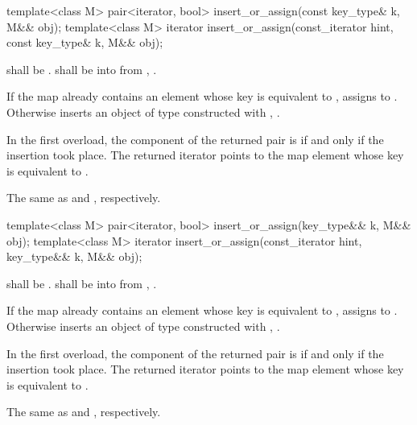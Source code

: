 %
\begin{itemdecl}
template<class M>
  pair<iterator, bool> insert_or_assign(const key_type& k, M&& obj);
template<class M>
  iterator insert_or_assign(const_iterator hint, const key_type& k, M&& obj);
\end{itemdecl}

\begin{itemdescr}
\pnum
\requires
{} shall be .
 shall be  into 
from , .

\pnum
\effects
If the map already contains an element 
whose key is equivalent to ,
assigns  to .
Otherwise inserts an object of type 
constructed with , .

\pnum
\returns
In the first overload,
the  component of the returned pair is 
if and only if the insertion took place.
The returned iterator points to the map element
whose key is equivalent to .

\pnum
\complexity
The same as  and ,
respectively.
\end{itemdescr}

%
\begin{itemdecl}
template<class M>
  pair<iterator, bool> insert_or_assign(key_type&& k, M&& obj);
template<class M>
  iterator insert_or_assign(const_iterator hint, key_type&& k, M&& obj);
\end{itemdecl}

\begin{itemdescr}
\pnum
\requires
{} shall be .
 shall be  into 
from , .

\pnum
\effects
If the map already contains an element 
whose key is equivalent to ,
assigns  to .
Otherwise inserts an object of type 
constructed with , .

\pnum
\returns
In the first overload,
the  component of the returned pair is 
if and only if the insertion took place.
The returned iterator points to the map element
whose key is equivalent to .

\pnum
\complexity
The same as  and ,
respectively.
\end{itemdescr}

